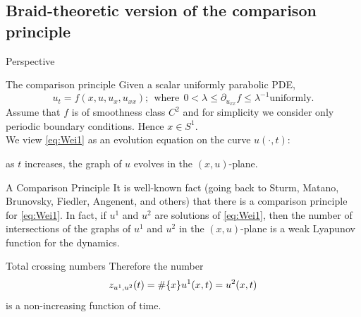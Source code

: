 \documentclass[9pt, english]{beamer}
\theoremstyle{definition}
\begin{document}
\subsection{Braid-theoretic version of the comparison principle}
\begin{frame}{Perspective}
    \begin{block}{The comparison principle}
        Given a scalar uniformly parabolic PDE,
        \begin{equation}\label{eq:Wei1}
        u_t=f(x, u, u_x, u_{xx}); \ \ \textrm{where}\ \ 0<\lambda \leq
        \partial_{u_{xx}}f \leq \lambda^{-1} \textrm{uniformly}.
        \end{equation}\pause
        Assume that $f$ is of smoothness class $C^2$ and
        for simplicity we consider only periodic boundary
        conditions. Hence $x \in S^1$.\pause \\
        We view \eqref{eq:Wei1} as an evolution equation on the
        curve $u(\cdot, t):$\pause

        \alert{as $t$ increases, the graph of $u$ evolves in the
        $(x,u)$-plane.}
    \end{block}
\end{frame}
\begin{frame}
    \begin{block}{A Comparison Principle}
        It is well-known fact (going back to Sturm, Matano, Brunovsky,
        Fiedler, Angenent, and others) that there is a \alert{comparison
        principle} for \eqref{eq:Wei1}. \pause
        In fact, if $u^1$ and $u^2$ are  solutions of \eqref{eq:Wei1},
        then the number of intersections of the graphs of $u^1$ and
        $u^2$ in the $(x,u)$-plane is a \alert{weak Lyapunov function
        for the dynamics}.
    \end{block}\pause
    \begin{block}{Total crossing numbers}
        Therefore the number
        {\color{blue}
        \[
        z_{u^1, u^2}(t)=\#{\{{x}\}}{u^1(x,t)=u^2(x,t)}
        \]\/}\pause
        is a non-increasing function of time.
    \end{block}

\end{frame}
\end{document}
